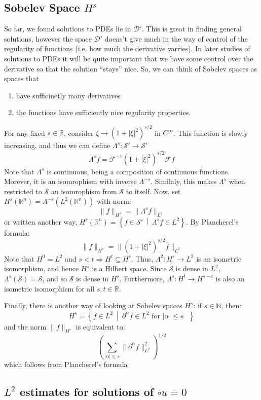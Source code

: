\documentclass{book}
\newcommand{\N}{{\mathbb{N}}}
\newcommand{\R}{{\mathbb{R}}}
\newcommand{\CD}{{\mathcal{D}}}
\newcommand{\CF}{{\mathcal{F}}}
\newcommand{\CS}{{\mathcal{S}}}
\newcommand{\sse}{\subseteq}
\newcommand{\rw}{\rightarrow}
\newcommand{\Rw}{\Rightarrow}
\newcommand{\set}[2]{\left\{#1 \ \middle|\ #2\right\}}
\begin{document}
\subsection[Sobelev Space]{Sobelev Space $H^s$}

So far, we found solutions to PDEs lie in $\CD'$. This is great in finding general solutions, however the space $\CD'$
doens't give much in the way of control of the regularity of functions (i.e. how much the derivative varries). In later
studies of solutions to PDEs it will be quite important that we have some control over the derivative so that the
solution ``stays'' nice. So, we can think of Sobelev spaces as spaces that
\begin{enumerate}
	\item have sufficinetly many derivatives
	\item the functions have sufficiently nice regularity properties.
\end{enumerate}

For any fixed $s \in \R$, consider $\xi \rw (1 + |\xi|^2)^{s/2}$ in $C^\infty$. This function is slowly increasing, and
thus we can define $\Lambda^s: \CS' \rw \CS'$
\[
	\Lambda^s f = \CF^{-1}(1+|\xi|^2)^{s/2}\CF f
\]
Note that $\Lambda^s$ is continuous, being a composition of continuous functions. Morever, it is an isomrophism with
inverse $\Lambda^{-s}$. Similaly, this makes $\Lambda^s$ when restricted to $\CS$ an isomrophism from $\CS$ to itself.
Now, set $H^s(\R^n) = \Lambda^{-s}(L^2(\R^n))$ with norm:
\[
	\|f\|_{H^s} = \|\Lambda^s f\|_{L^2}
\]
or written another way, $H^s(\R^n) = \set{f \in \CS'}{\Lambda^s f \in L^2}$. By Plancherel's formula:
\[
	\|f\|_{H^s} = \|(1+ |\xi|^2)^{s/2} \hat{f}\|_{L^2}
\]
Note that $H^0 = L^2$ and $s < t \Rw H^t \sse H^s$. Thus, $\Lambda^2: H^s \rw L^2$ is an isometric isomorphism, and
hence $H^s$ is a Hilbert space. Since $\CS$ is dense in $L^2$, $\Lambda^s(\CS) = \CS$, and so $\CS$ is dense in $H^s$.
Furthermore, $\Lambda^s: H^t \rw H^{s-t}$ is also an isometric isomorphism for all $s,t \in \R$.

Finally, there is another way of looking at Sobelev spaces $H^s$: if $s \in \N$, then:
\[
	H^s = \set{f \in L^2}{  \partial^\alpha f \in L^2\text{ for $|\alpha| \le s$ }}
\]
and the norm $\|f\|_{H^s}$ is equivalent to:
\[
	\left( \sum_{|\alpha| \le s} \|  \partial^\alpha f\|_{L^2}^2 \right)^{1/2}
\]
which follows from Plancherel's formula

\subsection[L squared estimtes for wave equation solutions]{$L^2$ estimates for solutions of $\square u =0$}
\end{document}
